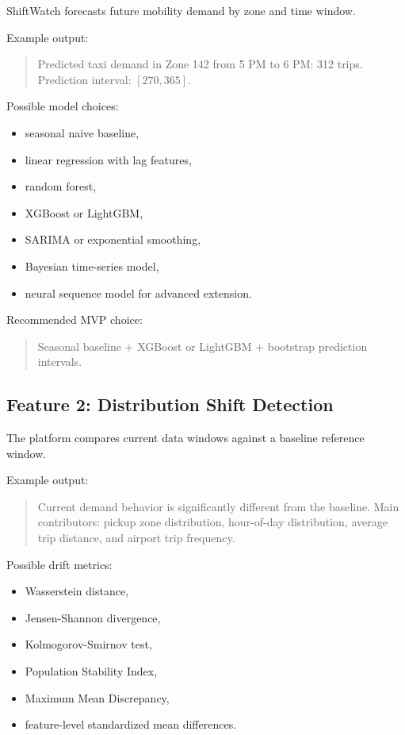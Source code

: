 \documentclass[11pt]{article}
\begin{document}
ShiftWatch forecasts future mobility demand by zone and time window.

Example output:

\begin{quote}
    Predicted taxi demand in Zone 142 from 5 PM to 6 PM: 312 trips. Prediction interval: $[270, 365]$.
\end{quote}

Possible model choices:

\begin{itemize}
    \item seasonal naive baseline,
    \item linear regression with lag features,
    \item random forest,
    \item XGBoost or LightGBM,
    \item SARIMA or exponential smoothing,
    \item Bayesian time-series model,
    \item neural sequence model for advanced extension.
\end{itemize}

Recommended MVP choice:

\begin{quote}
    Seasonal baseline + XGBoost or LightGBM + bootstrap prediction intervals.
\end{quote}

\subsection{Feature 2: Distribution Shift Detection}

The platform compares current data windows against a baseline reference window.

Example output:

\begin{quote}
    Current demand behavior is significantly different from the baseline. Main contributors: pickup zone distribution, hour-of-day distribution, average trip distance, and airport trip frequency.
\end{quote}

Possible drift metrics:

\begin{itemize}
    \item Wasserstein distance,
    \item Jensen-Shannon divergence,
    \item Kolmogorov-Smirnov test,
    \item Population Stability Index,
    \item Maximum Mean Discrepancy,
    \item feature-level standardized mean differences.
\end{itemize}
\end{document}
